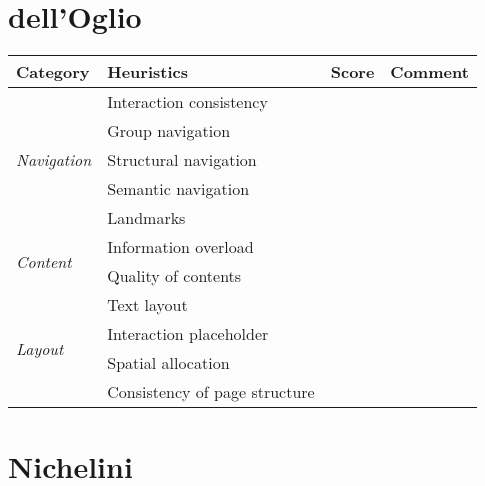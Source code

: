 \documentclass[a4paper, 11pt, parskip=half]{scrreprt}
\begin{document}
\section{dell'Oglio}

\begin{center}
    \def\arraystretch{1.3}
    \begin{tabular}{|l|l|l|m{7cm}|}
        \hline
        \textbf{Category} & \textbf{Heuristics} & \textbf{Score} & \textbf{Comment} \\ \hline
        \multirow{5}{*}{\textit{Navigation}} & Interaction consistency & & \\ \cline{2-4}
        & Group navigation & & \\ \cline{2-4}
        & Structural navigation & & \\ \cline{2-4}
        & Semantic navigation & & \\ \cline{2-4}
        & Landmarks & & \\ \hline
        \multirow{2}{*}{\textit{Content}} & Information overload &  & \\ \cline{2-4}
        & Quality of contents &  & 							\\ \hline
        \multirow{4}{*}{\textit{Layout}} & Text layout & & \\ \cline{2-4}
        & Interaction placeholder & & \\ \cline{2-4}
        & Spatial allocation & & \\ \cline{2-4}
        & Consistency of page structure & & \\ \hline
    \end{tabular}
\end{center}

\section{Nichelini}
\end{document}
